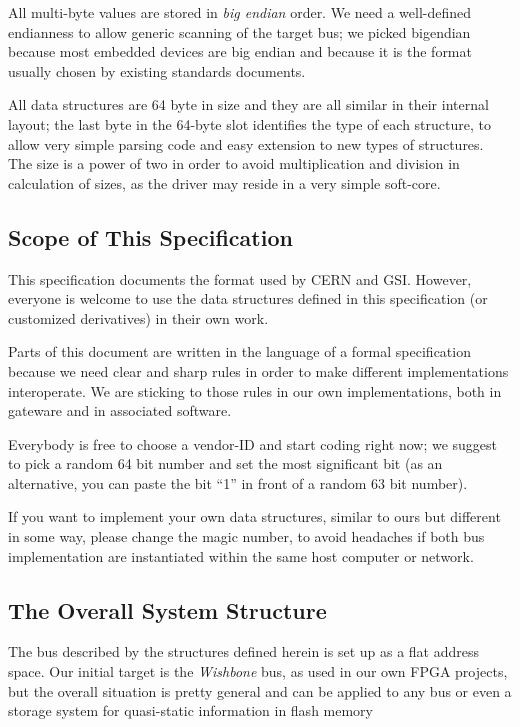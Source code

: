 \documentclass[a4paper, 12pt]{article}
\begin{document}
All multi-byte values are stored in \textit{big endian} order.  We need
a well-defined endianness to allow generic scanning of the target bus;
we picked bigendian because most embedded devices are big endian and
because  it is the format usually chosen by existing standards documents.

All data structures are 64 byte in size and they are all similar in their
internal layout; the last byte in the 64-byte slot identifies the type
of each structure, to allow very simple parsing code and easy extension
to new types of structures.  The size is a power of two in order to
avoid multiplication and division in calculation of sizes, as the
driver may reside in a very simple soft-core.


\subsection{Scope of This Specification}

This specification documents the format used by CERN and GSI. However,
everyone is welcome to use the data structures defined in this
specification (or customized derivatives) in their own work.

Parts of this document are written in the language of
a formal specification because we need clear and sharp rules in
order to make different implementations interoperate.  We are sticking
to those rules in our own implementations, both in gateware and in
associated software.

Everybody is free to choose a vendor-ID and start coding right now; we
suggest to pick a random 64 bit number and set the most significant
bit (as an alternative, you can paste the bit ``1'' in front of
a random 63 bit number).

If you want to implement your own data structures, similar to ours
but different in some way, please change the magic number, to avoid
headaches if both bus implementation are instantiated within the same host
computer or network.

\subsection{The Overall System Structure}

The bus described by the structures defined herein is set up as a
flat address space. Our initial target is the \textit{Wishbone} bus,
as used in our own FPGA projects, but the overall situation is
pretty general and can be applied to any bus or even a storage
system for quasi-static information in flash memory
\end{document}
